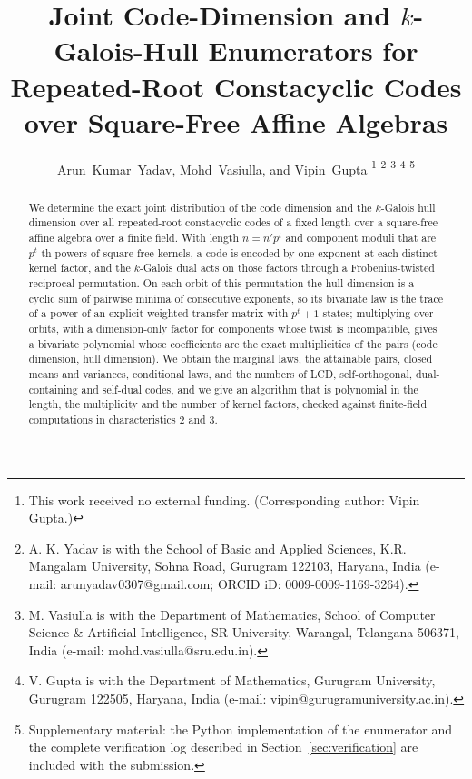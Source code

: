 \documentclass[12pt,journal,draftclsnofoot,onecolumn]{IEEEtran}
\theoremstyle{definition}
\theoremstyle{remark}
\begin{document}
\renewcommand{\baselinestretch}{1.4}\selectfont

\title{Joint Code-Dimension and \texorpdfstring{$k$}{k}-Galois-Hull Enumerators for
Repeated-Root Constacyclic Codes over Square-Free Affine Algebras}

\author{Arun~Kumar~Yadav, Mohd~Vasiulla, and Vipin~Gupta%
\thanks{This work received no external funding. (Corresponding author:
Vipin Gupta.)}%
\thanks{A. K. Yadav is with the School of Basic and Applied Sciences,
K.R. Mangalam University, Sohna Road, Gurugram 122103, Haryana, India
(e-mail: arunyadav0307@gmail.com; ORCID iD: 0009-0009-1169-3264).}
\thanks{M. Vasiulla is with the Department of Mathematics, School of Computer
Science \& Artificial Intelligence, SR University, Warangal, Telangana 506371,
India (e-mail: mohd.vasiulla@sru.edu.in).}
\thanks{V. Gupta is with the Department of Mathematics, Gurugram University,
Gurugram 122505, Haryana, India (e-mail: vipin@gurugramuniversity.ac.in).}
\thanks{Supplementary material: the Python implementation of the enumerator and
the complete verification log described in Section~\ref{sec:verification} are
included with the submission.}}

\maketitle

\begin{abstract}
We determine the exact joint distribution of the code dimension and the
$k$-Galois hull dimension over all repeated-root constacyclic codes of a fixed
length over a square-free affine algebra over a finite field. With length
$n=n'p^{t}$ and component moduli that are $p^{t}$-th powers of square-free
kernels, a code is encoded by one exponent at each distinct kernel factor, and
the $k$-Galois dual acts on those factors through a Frobenius-twisted
reciprocal permutation. On each orbit of this permutation the hull dimension is
a cyclic sum of pairwise minima of consecutive exponents, so its bivariate law
is the trace of a power of an explicit weighted transfer matrix with
$p^{t}+1$ states; multiplying over orbits, with a dimension-only factor for
components whose twist is incompatible, gives a bivariate polynomial whose
coefficients are the exact multiplicities of the pairs (code dimension, hull
dimension). We obtain the marginal laws, the attainable pairs, closed
means and variances, conditional laws, and the numbers of LCD,
self-orthogonal, dual-containing and self-dual codes, and we give an algorithm
that is polynomial in the length, the multiplicity and the number of kernel
factors, checked against finite-field computations in characteristics
$2$ and $3$.
\end{abstract}
\end{document}
